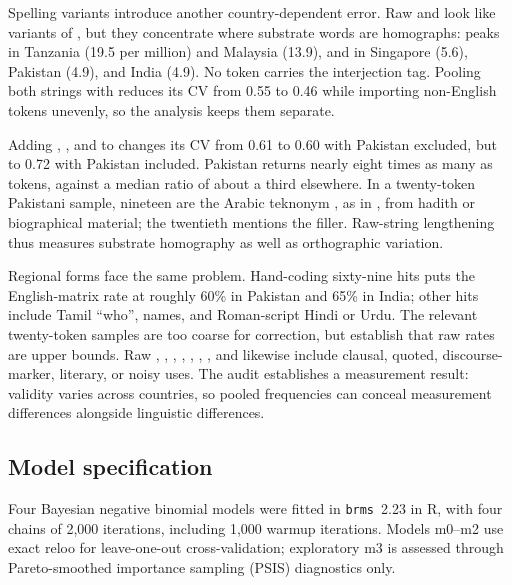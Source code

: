 \documentclass[12pt]{article}
\begin{document}
Spelling variants introduce another country-dependent error. Raw  and  look like variants of , but they concentrate where substrate words are homographs:  peaks in Tanzania (19.5 per million) and Malaysia (13.9), and  in Singapore (5.6), Pakistan (4.9), and India (4.9). No  token carries the interjection tag. Pooling both strings with  reduces its CV from 0.55 to 0.46 while importing non-English tokens unevenly, so the analysis keeps them separate.

Adding , , and  to  changes its CV from 0.61 to 0.60 with Pakistan excluded, but to 0.72 with Pakistan included. Pakistan returns nearly eight times as many  as  tokens, against a median ratio of about a third elsewhere. In a twenty-token Pakistani sample, nineteen are the Arabic teknonym , as in , from hadith or biographical material; the twentieth mentions the filler. Raw-string lengthening thus measures substrate homography as well as orthographic variation.

Regional forms face the same problem. Hand-coding sixty-nine  hits puts the English-matrix rate at roughly 60\% in Pakistan and 65\% in India; other hits include Tamil  \enquote{who}, names, and Roman-script Hindi or Urdu. The relevant twenty-token samples are too coarse for correction, but establish that raw rates are upper bounds. Raw , , , , , , , and  likewise include clausal, quoted, discourse-marker, literary, or noisy uses. The audit establishes a measurement result: validity varies across countries, so pooled frequencies can conceal measurement differences alongside linguistic differences.

\subsection{Model specification}

Four Bayesian negative binomial models were fitted in \texttt{brms}~2.23 in R, with four chains of 2,000 iterations, including 1,000 warmup iterations. Models m0--m2 use exact reloo for leave-one-out cross-validation; exploratory m3 is assessed through Pareto-smoothed importance sampling (PSIS) diagnostics only.
\end{document}
